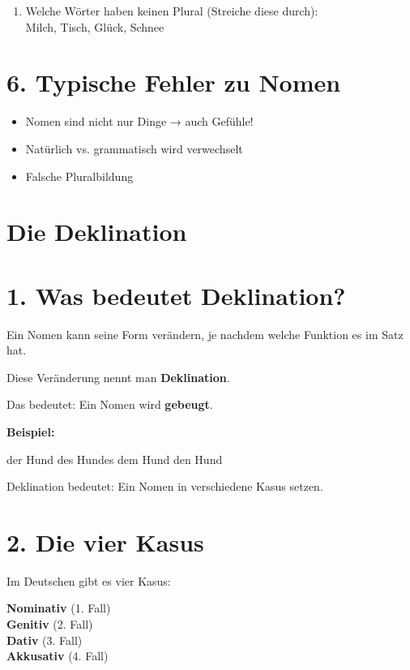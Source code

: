 \documentclass[a4paper,12pt]{article}
\begin{document}
\begin{enumerate}
\item Welche Wörter haben keinen Plural (Streiche diese durch):\\ Milch, Tisch, Glück, Schnee
\end{enumerate}

\section*{6. Typische Fehler zu Nomen}

\begin{itemize}
\item Nomen sind nicht nur Dinge → auch Gefühle!
\item Natürlich vs. grammatisch wird verwechselt
\item Falsche Pluralbildung
\end{itemize}

\section*{Die Deklination}

\section*{1. Was bedeutet Deklination?}

Ein Nomen kann seine Form verändern, je nachdem welche Funktion es im Satz hat.

Diese Veränderung nennt man \textbf{Deklination}.

Das bedeutet: Ein Nomen wird \textbf{gebeugt}.

\textbf{Beispiel:}

der Hund  
des Hundes  
dem Hund  
den Hund  

\begin{merksatz}
Deklination bedeutet: Ein Nomen in verschiedene Kasus setzen.
\end{merksatz}

\section*{2. Die vier Kasus}

Im Deutschen gibt es vier Kasus:

\textbf{Nominativ} (1. Fall) \\  
\textbf{Genitiv} (2. Fall)  \\
\textbf{Dativ} (3. Fall)  \\
\textbf{Akkusativ} (4. Fall)  
\end{document}
